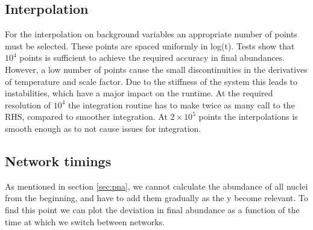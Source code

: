 \subsection{Interpolation}
\label{sec:interpolation}
For the interpolation on background variables an appropriate number of points must be selected. These points are spaced uniformly in log(t). Tests show that $10^4$ points is sufficient to achieve the required accuracy in final abundances. However, a low number of points cause the small discontinuities in the derivatives of temperature and scale factor. Due to the stiffness of the system this leads to instabilities, which have a major impact on the runtime. At the required resolution of $10^4$ the integration routine has to make twice as many call to the RHS, compared to smoother integration. At $2\times 10^5$ points the interpolations is smooth enough as to not cause issues for integration.


\subsection{Network timings}
\label{sec:networktiming}
As  mentioned in section \ref{sec:pna}, we cannot calculate the abundance of all nuclei from the beginning, and have to add them gradually as the y become relevant. To find this point we can plot the deviation in final abundance as a function of the time at which we switch between networks.
